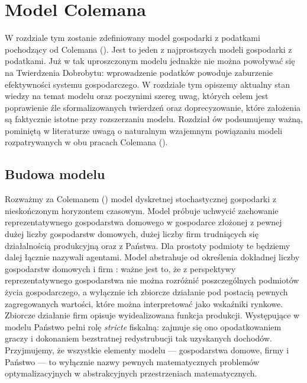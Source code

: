 
\chapter{Model Colemana}

	W rozdziale tym zostanie zdefiniowany model gospodarki z podatkami pochodzący od Colemana (\citeyear{Coleman1}). Jest to jeden z najprostszych modeli gospodarki z podatkami. Już w tak uproszczonym modelu jednakże nie można powoływać się na Twierdzenia Dobrobytu: wprowadzenie podatków powoduje zaburzenie efektywności systemu gospodarczego. W rozdziale tym opiszemy aktualny stan wiedzy na temat modelu oraz poczynimi szereg uwag, których celem jest poprawienie źle sformalizowanych twierdzeń oraz doprecyzowanie, które założenia są faktycznie istotne przy rozszerzaniu modelu. Rozdział ów podsumujemy ważną, pominiętą w literaturze uwagą o naturalnym wzajemnym powiązaniu modeli rozpatrywanych w obu pracach Colemana (\citeyear{Coleman1, Coleman2}).  

\section{Budowa modelu}\label{chap1sec1}

	Rozważmy za Colemanem (\citeyear{Coleman1}) model dyskretnej stochastycznej gospodarki z nieskończonym horyzontem czasowym. Model próbuje uchwycić zachowanie reprezentatywnego gospodarstwa domowego w gospodarce złożonej z pewnej dużej liczby gospodarstw domowych, dużej liczby firm trudniących się działalnością produkcyjną oraz z Państwa. Dla prostoty podmioty te będziemy dalej łącznie nazywali agentami. Model abstrahuje od określenia dokładnej liczby gospodarstw domowych i firm : ważne jest to, że z perspektywy reprezentatywnego gospodarstwa nie można rozróżnić poszczególnych podmiotów życia gospodarczego, a wyłącznie ich zbiorcze działanie pod postacią pewnych zagregowanych wartości, które można interpretować jako wskaźniki rynkowe. Zbiorcze działanie firm opisuje wyidealizowana funkcja produkcji. Występujące w modelu Państwo pełni rolę {\it stricte} fiskalną: zajmuje się ono opodatkowaniem graczy i dokonaniem bezstratnej redystrubucji tak uzyskanych dochodów. Przyjmujemy, że wszystkie elementy modelu --- gospodarstwa domowe, firmy i Państwo --- to wyłącznie nazwy pewnych matematycznych problemów optymalizacyjnych w abstrakcyjnych przestrzeniach matematycznych. 

